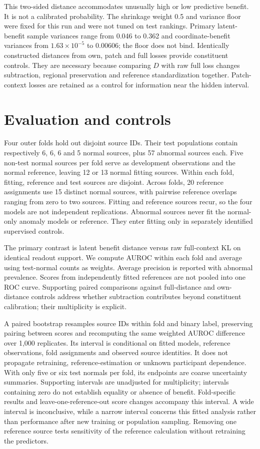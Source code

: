 \documentclass[letterpaper]{article}
\begin{document}
This two-sided distance accommodates unusually high or low predictive benefit. It is not a calibrated probability. The shrinkage weight 0.5 and variance floor were fixed for this run and were not tuned on test rankings. Primary latent-benefit sample variances range from 0.046 to 0.362 and coordinate-benefit variances from \(1.63\times10^{-5}\) to 0.00606; the floor does not bind. Identically constructed distances from own, patch and full losses provide constituent controls. They are necessary because comparing \(D\) with raw full loss changes subtraction, regional preservation and reference standardization together. Patch-context losses are retained as a control for information near the hidden interval.

\section{Evaluation and controls}

Four outer folds hold out disjoint source IDs. Their test populations contain respectively 6, 6, 6 and 5 normal sources, plus 57 abnormal sources each. Five non-test normal sources per fold serve as development observations and the normal reference, leaving 12 or 13 normal fitting sources. Within each fold, fitting, reference and test sources are disjoint. Across folds, 20 reference assignments use 15 distinct normal sources, with pairwise reference overlaps ranging from zero to two sources. Fitting and reference sources recur, so the four models are not independent replications. Abnormal sources never fit the normal-only anomaly models or reference. They enter fitting only in separately identified supervised controls.

The primary contrast is latent benefit distance versus raw full-context KL on identical readout support. We compute AUROC within each fold and average using test-normal counts as weights. Average precision is reported with abnormal prevalence. Scores from independently fitted references are not pooled into one ROC curve. Supporting paired comparisons against full-distance and own-distance controls address whether subtraction contributes beyond constituent calibration; their multiplicity is explicit.

A paired bootstrap resamples source IDs within fold and binary label, preserving pairing between scores and recomputing the same weighted AUROC difference over 1,000 replicates. Its interval is conditional on fitted models, reference observations, fold assignments and observed source identities. It does not propagate retraining, reference-estimation or unknown participant dependence. With only five or six test normals per fold, its endpoints are coarse uncertainty summaries. Supporting intervals are unadjusted for multiplicity; intervals containing zero do not establish equality or absence of benefit. Fold-specific results and leave-one-reference-out score changes accompany this interval. A wide interval is inconclusive, while a narrow interval concerns this fitted analysis rather than performance after new training or population sampling. Removing one reference source tests sensitivity of the reference calculation without retraining the predictors.
\end{document}
